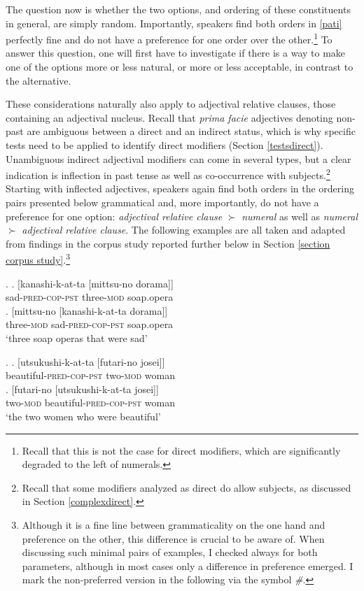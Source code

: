 The question now is whether the two options, and ordering of these constituents in general, are simply random. Importantly, speakers find both orders in \ref{pati} perfectly fine and do not have a preference for one order over the other.\footnote{Recall that this is not the case for direct modifiers, which are significantly degraded to the left of numerals.} To answer this question, one will first have to investigate if there is a way to make one of the options more or less natural, or more or less acceptable, in contrast to the alternative.

These considerations naturally also apply to adjectival relative clauses, those containing an adjectival nucleus. Recall that \textit{prima facie} adjectives denoting non-past are ambiguous between a direct and an indirect status, which is why specific tests need to be applied to identify direct modifiers (Section \ref{testsdirect}). Unambiguous indirect adjectival modifiers can come in several types, but a clear indication is inflection in past tense as well as co-occurrence with subjects.\footnote{Recall that some modifiers analyzed as direct do allow subjects, as discussed in Section \ref{complexdirect}.} Starting with inflected adjectives, speakers again find both orders in the ordering pairs presented below grammatical and, more importantly, do not have a preference for one option: \textit{adjectival relative clause} $\succ$ \textit{numeral} as well as \textit{numeral} $\succ$ \textit{adjectival relative clause}. The following examples are all taken and adapted from findings in the corpus study reported further below in Section \ref{section corpus study}.\footnote{Although it is a fine line between grammaticality on the one hand and preference on the other, this difference is crucial to be aware of. When discussing such minimal pairs of examples, I checked always for both parameters, although in most cases only a difference in preference emerged. I mark the non-preferred version in the following via the symbol \textit{\#}.} 

\ex. \label{kanashikatta} \ag. [kanashi-k-at-ta [mittsu-no dorama]]\\
sad-\textsc{pred-cop-pst} three-\textsc{mod} soap.opera\\
\bg. [mittsu-no [kanashi-k-at-ta dorama]]\\
three-\textsc{mod} sad-\textsc{pred-cop-pst} soap.opera\\
`three soap operas that were sad' \label{soapoperajapanese}

\ex. \label{kanashikattafutari} \ag. [utsukushi-k-at-ta [futari-no josei]]\\
beautiful-\textsc{pred-cop-pst} two-\textsc{mod} woman\\
\bg. [futari-no [utsukushi-k-at-ta josei]]\\
two-\textsc{mod} beautiful-\textsc{pred-cop-pst} woman\\
`the two women who were beautiful'

